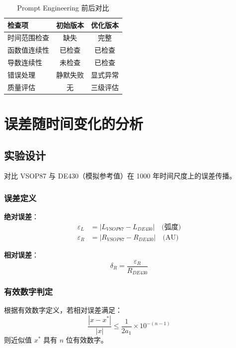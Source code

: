 \documentclass[12pt,a4paper]{article}
\begin{document}
\begin{table}[H]
\centering
\caption{Prompt Engineering 前后对比}
\begin{tabular}{lcc}
\toprule
\textbf{检查项} & \textbf{初始版本} & \textbf{优化版本} \\
\midrule
时间范围检查 & 缺失 & 完整 \\
函数值连续性 & 已检查 & 已检查 \\
导数连续性 & 未检查 & 已检查 \\
错误处理 & 静默失败 & 显式异常 \\
质量评估 & 无 & 三级评估 \\
\bottomrule
\end{tabular}
\end{table}

\section{误差随时间变化的分析}

\subsection{实验设计}

对比 VSOP87 与 DE430（模拟参考值）在 1000 年时间尺度上的误差传播。

\subsubsection{误差定义}

\textbf{绝对误差}：
\begin{align}
    \varepsilon_L &= |L_{VSOP87} - L_{DE430}| \quad \text{(弧度)} \\
    \varepsilon_R &= |R_{VSOP87} - R_{DE430}| \quad \text{(AU)}
\end{align}

\textbf{相对误差}：
\begin{equation}
    \delta_R = \frac{\varepsilon_R}{R_{DE430}}
\end{equation}

\subsubsection{有效数字判定}

根据有效数字定义，若相对误差满足：
\begin{equation}
    \frac{|x - x^*|}{|x|} \leq \frac{1}{2a_1} \times 10^{-(n-1)}
\end{equation}
则近似值 $x^*$ 具有 $n$ 位有效数字。
\end{document}
